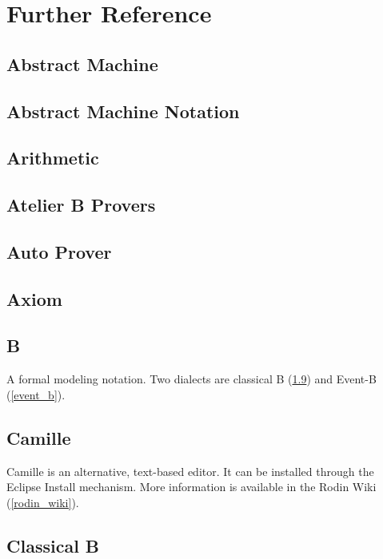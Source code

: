 \section{Further Reference}
\label{reference_10}


\subsection{Abstract Machine}
\label{abstract_machine}

\subsection{Abstract Machine Notation}
\label{abstract_machine_notation}

\subsection{Arithmetic}
\label{arithmetic}

\subsection{Atelier B Provers}
\label{atelier_b_provers}

\subsection{Auto Prover}
\label{auto_prover}

\subsection{Axiom}
\label{axiom}

\subsection{B}
\label{b}

A formal modeling notation.  Two dialects are classical B (\ref{classical_b}) and Event-B (\ref{event_b}).

\subsection{Camille}
\label{camille}

Camille is an alternative, text-based editor.  It can be installed through the Eclipse Install mechanism.  More information is available in the Rodin Wiki (\ref{rodin_wiki}).

\subsection{Classical B}
\label{classical_b}

